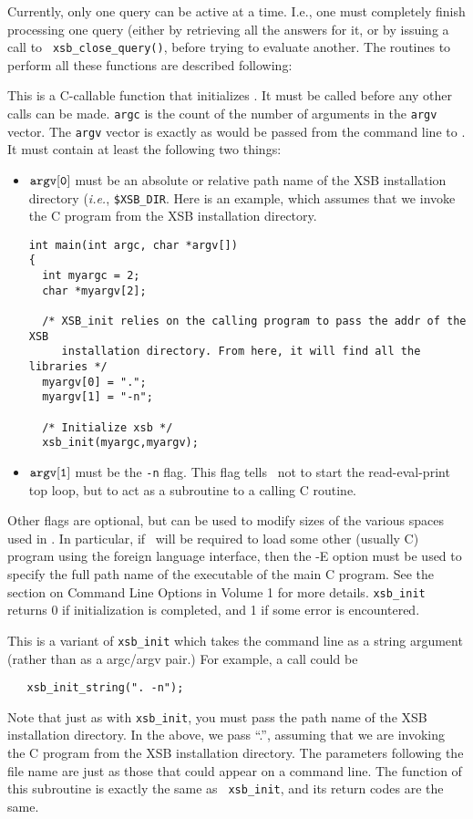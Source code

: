 Currently, only one query can be active at a time.
I.e., one must completely finish processing one query (either by
retrieving all the answers for it, or by issuing a call to {\tt
xsb\_close\_query()}, before trying to evaluate another.  The
routines to perform all these functions are described following:

\begin{description}
 
This is a C-callable function that initializes \ourprolog . It must be
called before any other calls can be made.  {\tt argc} is the count of
the number of arguments in the {\tt argv} vector.  The {\tt argv}
vector is exactly as would be passed from the command line to
\ourprolog .  It must contain at least the following two things:
\begin{itemize}
\item $\tt argv[0]$ must be an absolute or relative path name of the XSB
  installation directory ({\it i.e.}, {\tt \$XSB\_DIR}.  Here is an
  example, which assumes that we invoke the C program from the XSB
  installation directory.
    \begin{verbatim}
int main(int argc, char *argv[])
{ 
  int myargc = 2;
  char *myargv[2];

  /* XSB_init relies on the calling program to pass the addr of the XSB
     installation directory. From here, it will find all the libraries */
  myargv[0] = ".";
  myargv[1] = "-n";

  /* Initialize xsb */
  xsb_init(myargc,myargv);
    \end{verbatim}
  \item $\tt argv[1]$ must be the {\tt -n} flag.  This flag tells
    \ourprolog\ not to start the read-eval-print top loop, but to act as a
    subroutine to a calling C routine.
\end{itemize}
Other flags are optional, but can be used to modify sizes of the various
spaces used in \ourprolog.  In particular, if \ourprolog\ will be required
to load some other (usually C) program using the foreign language
interface, then the -E option must be used to specify the full path name of
the executable of the main C program.  See the section on Command Line
Options in Volume 1 
for more details.  {\tt xsb\_init} returns 0 if initialization is
completed, and 1 if some error is encountered.

 
This is a variant of {\tt xsb\_init} which takes the command line as a
string argument (rather than as a argc/argv pair.)  For example, a call
could be
\begin{verbatim}
   xsb_init_string(". -n");
\end{verbatim}
Note that just as with {\tt xsb\_init}, you must pass the path name of the
XSB installation directory. In the above, we pass ``.'', assuming that we
are invoking the C program from the XSB installation directory.  The
parameters following the file name are just as those that could appear on a
command line.  The function of this subroutine is exactly the same as {\tt
  xsb\_init}, and its return codes are the same.


\end{description}

